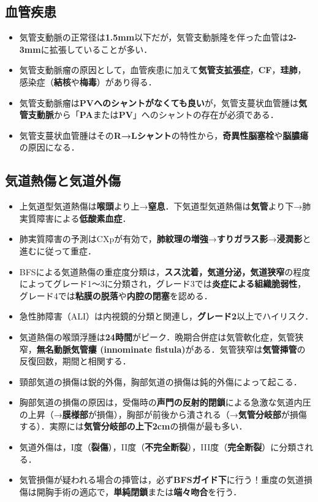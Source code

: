 \subsection{血管疾患}
\begin{itemize}
\item 気管支動脈の正常径は\textbf{1.5mm}以下だが，気管支動脈隆を伴った血管は\textbf{2-3mm}に拡張していることが多い．
\item 気管支動脈瘤の原因として，血管疾患に加えて\textbf{気管支拡張症}，\textbf{CF}，\textbf{珪肺}，感染症（\textbf{結核}や\textbf{梅毒}）があり得る．
\item 気管支動脈瘤は\textbf{PVへのシャントがなくても良い}が，気管支蔓状血管腫は\textbf{気管支動脈}から「\textbf{PA}または\textbf{PV}」へのシャントの存在が必須である．
\item 気管支蔓状血管腫はその\textbf{R→Lシャント}の特性から，\textbf{奇異性脳塞栓}や\textbf{脳膿瘍}の原因になる．

\end{itemize}

\subsection{気道熱傷と気道外傷}

\begin{itemize}

\item 上気道型気道熱傷は\textbf{喉頭}より上→\textbf{窒息}．下気道型気道熱傷は\textbf{気管}より下→肺実質障害による\textbf{低酸素血症}．
\item 肺実質障害の予測はCXpが有効で，\textbf{肺紋理の増強}→\textbf{すりガラス影}→\textbf{浸潤影}と進むに従って重症．
\item BFSによる気道熱傷の重症度分類は，\textbf{スス沈着，気道分泌，気道狭窄}の程度によってグレード1〜3に分類され，グレード3では\textbf{炎症による組織脆弱性}，グレード4では\textbf{粘膜の脱落}や\textbf{内腔の閉塞}を認める．
\item 急性肺障害（ALI）は内視鏡的分類と関連し，\textbf{グレード2}以上でハイリスク．
\item 気道熱傷の喉頭浮腫は\textbf{24時間}がピーク．晩期合併症は気管軟化症，気管狭窄，\textbf{無名動脈気管瘻 (innominate fistula)}がある．気管狭窄は\textbf{気管挿管}の反復回数，期間と相関する．
\item 頸部気道の損傷は鋭的外傷，胸部気道の損傷は鈍的外傷によって起こる．
\item 胸部気道の損傷の原因は，受傷時の\textbf{声門の反射的閉鎖}による急激な気道内圧の上昇（→\textbf{膜様部}が損傷），胸部が前後から潰される（→\textbf{気管分岐部}が損傷する）．実際には\textbf{気管分岐部の上下2cm}の損傷が最も多い．
\item 気道外傷は，I度（\textbf{裂傷}），II度（\textbf{不完全断裂}），III度（\textbf{完全断裂}）に分類される．
\item 気管損傷が疑われる場合の挿管は，必ず\textbf{BFSガイド下}に行う！重度の気道損傷は開胸手術の適応で，\textbf{単純閉鎖}または\textbf{端々吻合}を行う．


\end{itemize}

